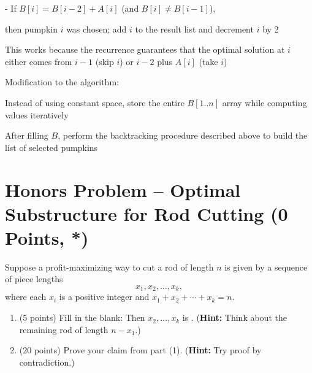 \begin{enumerate}
\begin{solution}
    - If \( B[i] = B[i-2] + A[i] \) (and \( B[i] \ne B[i-1] \)), 
    
    \hspace{1cm} then pumpkin \( i \) was chosen; add \( i \) to the result list and decrement \( i \) by 2

  
This works because the recurrence guarantees that the optimal solution at \( i \) either comes from \( i-1 \) (skip \( i \)) or \( i-2 \) plus \( A[i] \) (take \( i \))

\vspace{1cm}

Modification to the algorithm:

Instead of using constant space, store the entire \( B[1..n] \) array while computing values iteratively

After filling \( B \), perform the backtracking procedure described above to build the list of selected pumpkins


\end{solution}
\end{enumerate}

\section*{Honors Problem -- Optimal Substructure for Rod Cutting (0 Points, *)}

Suppose a profit-maximizing way to cut a rod of length $n$ is given by a sequence of piece lengths
\[
x_1, x_2, \dots, x_k,
\]
where each $x_i$ is a positive integer and $x_1 + x_2 + \cdots + x_k = n$.

\begin{enumerate}
    \item (5 points) Fill in the blank: Then $x_2, \dots, x_k$ is \underline{\hspace{5cm}}.  
    \newline (\textbf{Hint:} Think about the remaining rod of length $n - x_1$.)
    \begin{solution}
        \vspace{1cm}
    \end{solution}
   
\newpage
    \item (20 points) Prove your claim from part (1). (\textbf{Hint:} Try proof by contradiction.)

    \begin{solution}
        \vspace{3cm}
    \end{solution}
   
\end{enumerate}


